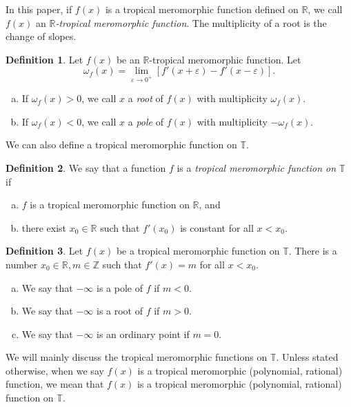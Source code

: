 \documentclass{amsart}
\theoremstyle{definition}
\newtheorem{defn}{Definition}[section]
\theoremstyle{remark}
\begin{document}
In this paper, if $f(x)$ is a tropical meromorphic function defined on ${\mathbb{R}}$, we call $f(x)$ an \emph{${\mathbb{R}}$-tropical meromorphic function}. The multiplicity of a root is the change of slopes. 

\begin{defn}\label{defn:mult}
Let $f(x)$ be an ${\mathbb{R}}$-tropical meromorphic function. Let 
\[
{\omega}_f(x) = \lim_{\varepsilon \to 0^+} \left[ f'(x+\varepsilon) - f'(x-\varepsilon) \right].
\]
\begin{enumerate}[(a)]
\item If ${\omega}_f(x) > 0$, we call $x$ a \emph{root} of $f(x)$ with multiplicity ${\omega}_f(x)$.
\item If ${\omega}_f(x) < 0$, we call $x$ a \emph{pole} of $f(x)$ with multiplicity $-{\omega}_f(x)$.
\end{enumerate}
\end{defn}

We can also define a tropical meromorphic function on ${\mathbb{T}}$.

\begin{defn}
We say that a function $f$ is a \emph{tropical meromorphic function on ${\mathbb{T}}$} if 
\begin{enumerate}[(a)]
\item $f$ is a tropical meromorphic function on ${\mathbb{R}}$, and
\item there exist $x_0 \in {\mathbb{R}}$ such that $f'(x_0)$ is constant for all $x < x_0$.
\end{enumerate}
\end{defn}

\begin{defn}
Let $f(x)$ be a tropical meromorphic function on ${\mathbb{T}}$. There is a number $x_0 \in {\mathbb{R}}, m \in {\mathbb{Z}}$ such that $f'(x) = m$ for all $x < x_0$.
\begin{enumerate}[(a)]
\item We say that $-\infty$ is a pole of $f$ if $m < 0$.
\item We say that $-\infty$ is a root of $f$ if $m > 0$.
\item We say that $-\infty$ is an ordinary point if $m=0$.
\end{enumerate}
\end{defn}

We will mainly discuss the tropical meromorphic functions on ${\mathbb{T}}$. Unless stated otherwise, when we say $f(x)$ is a tropical meromorphic (polynomial, rational) function, we mean that $f(x)$ is a tropical meromorphic (polynomial, rational) function on ${\mathbb{T}}$.
\end{document}
